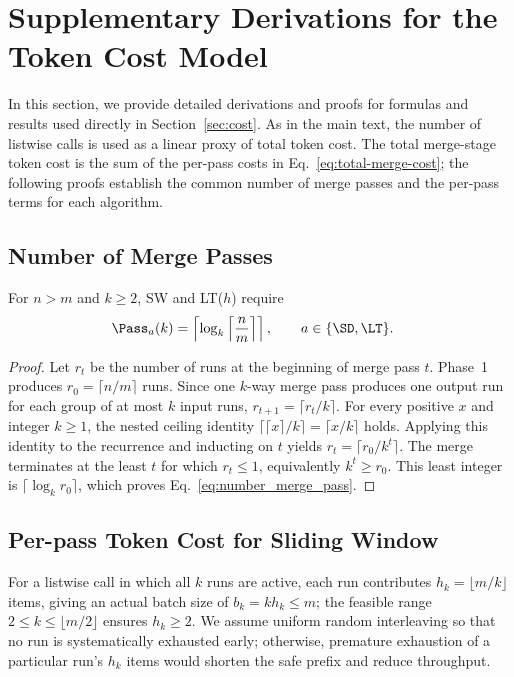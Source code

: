 \section{Supplementary Derivations for the Token Cost Model}
\label{sec:cost-derivations}

In this section, we provide detailed derivations and proofs for formulas and results used directly in Section~\ref{sec:cost}. As in the main text, the number of listwise calls is used as a linear proxy of total token cost. The total merge-stage token cost is the sum of the per-pass costs in Eq.~\eqref{eq:total-merge-cost}; the following proofs establish the common number of merge passes and the per-pass terms for each algorithm.

\subsection{Number of Merge Passes}

\begin{proposition}
For $n>m$ and $k\ge2$, SW and LT($h$) require
\begin{align}
  \Pass_a(k)
  &=\left\lceil
    \log_k\left\lceil\frac{n}{m}\right\rceil
    \right\rceil,
    \qquad a\in\{\SD,\LT\}.
\end{align}
\end{proposition}

\begin{proof}
Let $r_t$ be the number of runs at the beginning of merge pass $t$. Phase~1 produces $r_0=\lceil n/m\rceil$ runs. Since one $k$-way merge pass produces one output run for each group of at most $k$ input runs, $r_{t+1}=\lceil r_t/k\rceil$. For every positive $x$ and integer $k\ge1$, the nested ceiling identity $\lceil\lceil x\rceil/k\rceil=\lceil x/k\rceil$ holds. Applying this identity to the recurrence and inducting on $t$ yields $r_t=\lceil r_0/k^t\rceil$. The merge terminates at the least $t$ for which $r_t\le1$, equivalently $k^t\ge r_0$. This least integer is $\lceil\log_k r_0\rceil$, which proves Eq.~\eqref{eq:number_merge_pass}.
\end{proof}

\subsection{Per-pass Token Cost for Sliding Window}

For a listwise call in which all $k$ runs are active, each run contributes $h_k=\lfloor m/k\rfloor$ items, giving an actual batch size of $b_k=kh_k\le m$; the feasible range $2\le k\le\lfloor m/2\rfloor$ ensures $h_k\ge2$. We assume uniform random interleaving so that no run is systematically exhausted early; otherwise, premature exhaustion of a particular run's $h_k$ items would shorten the safe prefix and reduce throughput.

